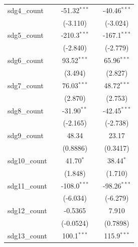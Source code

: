 \begin{tabular}{lcccc}
   sdg4\_count       &                   & -51.32$^{***}$    &                   & -40.46$^{***}$\\   
                     &                   & (-3.110)          &                   & (-3.024)\\   
   sdg5\_count       &                   & -210.3$^{***}$    &                   & -167.1$^{***}$\\   
                     &                   & (-2.840)          &                   & (-2.779)\\   
   sdg6\_count       &                   & 93.52$^{***}$     &                   & 65.96$^{***}$\\   
                     &                   & (3.494)           &                   & (2.827)\\   
   sdg7\_count       &                   & 76.03$^{***}$     &                   & 48.72$^{***}$\\   
                     &                   & (2.870)           &                   & (2.753)\\   
   sdg8\_count       &                   & -31.90$^{**}$     &                   & -42.45$^{***}$\\   
                     &                   & (-2.165)          &                   & (-2.738)\\   
   sdg9\_count       &                   & 48.34             &                   & 23.17\\   
                     &                   & (0.8886)          &                   & (0.3417)\\   
   sdg10\_count      &                   & 41.70$^{*}$       &                   & 38.44$^{*}$\\   
                     &                   & (1.848)           &                   & (1.710)\\   
   sdg11\_count      &                   & -108.0$^{***}$    &                   & -98.26$^{***}$\\   
                     &                   & (-6.034)          &                   & (-6.279)\\   
   sdg12\_count      &                   & -0.5365           &                   & 7.910\\   
                     &                   & (-0.0524)         &                   & (0.7898)\\   
   sdg13\_count      &                   & 100.1$^{***}$     &                   & 115.9$^{***}$\\   

\end{tabular}
